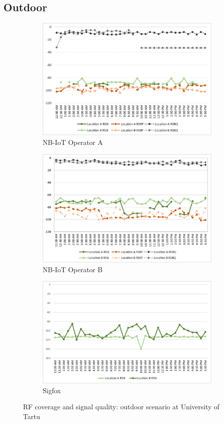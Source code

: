 \documentclass[conference,a4paper,xcolor=table]{IEEEtran}
\begin{document}
\subsection{Outdoor}
\begin{figure}[h]
\begin{subfigure}[t]{\linewidth}
  \centering
  \includegraphics[width=.7\linewidth]{images/tartu/ATartuOut.pdf}  
  \caption{NB-IoT Operator A}
\end{subfigure}
\begin{subfigure}[t]{\linewidth}
  \centering
  \includegraphics[width=.7\linewidth]{images/tartu/BTartuOut.pdf}  
  \caption{NB-IoT Operator B}
\end{subfigure}

\begin{subfigure}[t]{\linewidth}
  \centering
  \includegraphics[width=.7\linewidth]{images/tartu/STartuOut.pdf}  
\caption{Sigfox}
 \end{subfigure}
\caption{RF coverage and signal quality: outdoor scenario at University of Tartu}
 \label{RFOutdoor UT}
\end{figure}
\end{document}
